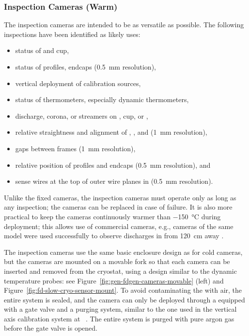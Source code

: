 \subsubsection{Inspection Cameras (Warm)}

The inspection cameras are intended to be as versatile as possible.
The following %
inspections have been identified as likely uses:
\begin{itemize}
\item status of  \fdth and cup,
\item status of  profiles, endcaps (\SI{0.5}{mm} resolution),
\item vertical deployment of calibration sources,
\item status of thermometers, especially dynamic thermometers,
\item {} discharge, corona, or streamers on  \fdth, cup, or ,
\item relative straightness and alignment of , , and  (\SI{1}{mm} resolution),
\item gaps between  frames (\SI{1}{mm} resolution),
\item relative position of profiles and endcaps (\SI{0.5}{mm} resolution), and 
\item sense wires at the top of outer wire planes in \single {} (\SI{0.5}{mm} resolution).
\end{itemize}

Unlike the fixed cameras, the inspection cameras must operate only as
long as any inspection; the cameras can be replaced in case of failure.  It
is also more practical to keep the cameras continuously warmer than
 \SI{-150}{\celsius} during deployment; this allows use of  %
commercial cameras, %
e.g., cameras of the same model were used successfully to observe discharges
in  from \SI{120}{cm} away \cite{Auger:2015xlo}.


The inspection cameras use the same basic
enclosure design as for cold cameras, but the cameras are mounted on a movable
fork so that each camera can be inserted and removed from the cryostat,
using a design similar to the dynamic temperature probes: see
 Figure~\ref{fig:gen-fdgen-cameras-movable} (left) and
 Figure~\ref{fig:fd-slow-cryo-sensor-mount}.  To avoid contaminating the
 with air, the entire system is sealed, and the
camera can only be deployed through a \fdth equipped with a gate
valve and a purging system, similar to the one used in the vertical axis
calibration system at \kamland~\cite{Banks:2014hra}. The entire system
is  purged with pure argon gas before the gate valve is opened.

